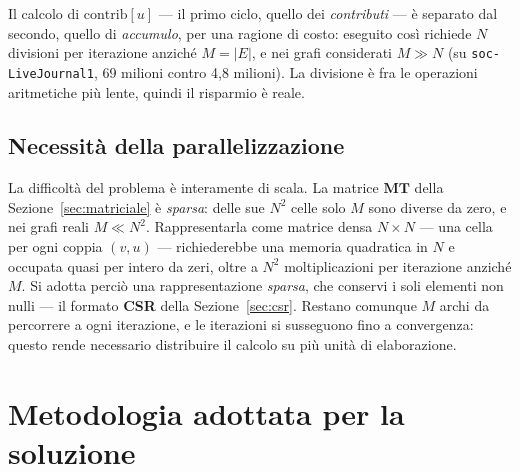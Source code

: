 \documentclass[11pt,a4paper]{article}
\begin{document}
Il calcolo di $\mathrm{contrib}[u]$ --- il primo ciclo, quello dei
\emph{contributi} --- è separato dal secondo, quello di \emph{accumulo}, per
una ragione di costo: eseguito così richiede $N$ divisioni per iterazione
anziché $M=|E|$, e nei grafi considerati $M \gg N$ (su
\texttt{soc-LiveJournal1}, 69 milioni contro 4,8 milioni). La divisione è fra
le operazioni aritmetiche più lente, quindi il risparmio è reale.

\subsection{Necessità della parallelizzazione}
La difficoltà del problema è interamente di scala. La matrice $\mathbf{MT}$
della Sezione~\ref{sec:matriciale} è \emph{sparsa}: delle sue $N^2$ celle
solo $M$ sono diverse da zero, e nei grafi reali $M \ll N^2$. Rappresentarla
come matrice densa $N \times N$ --- una cella per ogni coppia $(v,u)$ ---
richiederebbe una memoria quadratica in $N$ e occupata quasi per intero da
zeri, oltre a $N^2$ moltiplicazioni per iterazione anziché $M$. Si adotta
perciò una rappresentazione \emph{sparsa}, che conservi i soli elementi non
nulli --- il formato \textbf{CSR} della
Sezione~\ref{sec:csr}. Restano comunque $M$ archi da percorrere a ogni
iterazione, e le iterazioni si susseguono fino a convergenza: questo rende
necessario distribuire il calcolo su più unità di elaborazione.

\section{Metodologia adottata per la soluzione}
\end{document}
